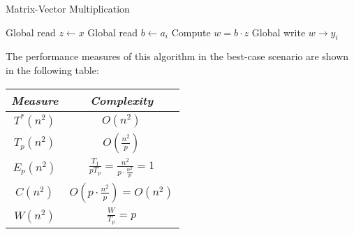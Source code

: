 \begin{example}
    \begin{algorithm}[H]
        \caption{Matrix-Vector Multiplication}
        \begin{algorithmic}[1]
            \State Global read $z \leftarrow x$ 
            \State Global read $b \leftarrow a_i$ 
            \State Compute $w = b \cdot z$ 
            \State Global write $w \rightarrow y_i$ 
        \end{algorithmic}
    \end{algorithm}  
    The performance measures of this algorithm in the best-case scenario are shown in the following table:
    \renewcommand*{\arraystretch}{2}
    \begin{table}[H]
        \centering
        \begin{tabular}{|c|c|}
        \hline
        \textit{Measure} & \textit{Complexity} \\ \hline
        $T^\ast(n^2)$ & $O(n^2)$ \\ \hline
        $T_p(n^2)$ & $O\left(\frac{n^2}{p}\right)$ \\ \hline
        $E_p(n^2)$ & $\frac{T_1}{p T_p} = \frac{n^2}{p \cdot \frac{n^2}{p}} = 1$ \\ \hline
        $C(n^2)$ & $O\left(p \cdot \frac{n^2}{p}\right) = O(n^2)$ \\ \hline
        $W(n^2)$ & $\frac{W}{T_p} = p$ \\ \hline

        \end{tabular}
    \end{table}
    \renewcommand*{\arraystretch}{1}
\end{example}
